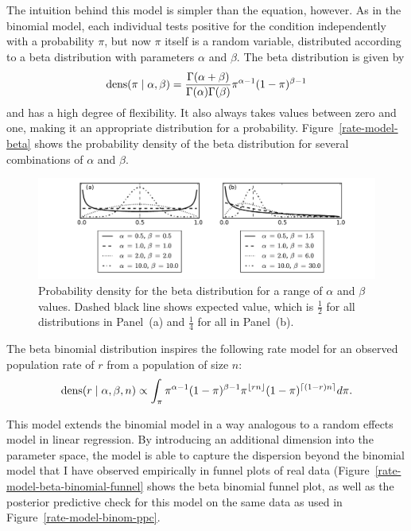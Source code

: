 The intuition behind this model is simpler than the equation,
however. As in the binomial model, each individual tests positive for
the condition independently with a probability $\pi$, but now $\pi$
itself is a random variable, distributed according to a beta
distribution with parameters $\alpha$ and $\beta$. The beta
distribution is given by 
\[
\operatorname{dens}(\pi\;|\; \alpha, \beta)
=\frac{\Gamma(\alpha+\beta)}{\Gamma(\alpha)\Gamma(\beta)}\pi^{\alpha-1}(1-\pi)^{\beta-1}
\]
and has a high degree of flexibility.  It also always takes values
between zero and one, making it an appropriate distribution for a
probability.  Figure~\ref{rate-model-beta} shows the probability
density of the beta distribution for several combinations of $\alpha$
and $\beta$.
\begin{figure}[ht]
\begin{center}
\includegraphics[width=\textwidth]{beta-distribution.pdf}
\end{center}
\caption{Probability density for the beta distribution for a range of
  $\alpha$ and $\beta$ values. Dashed black line shows expected value,
  which is $\frac{1}{2}$ for all distributions in Panel~(a) and
  $\frac{1}{4}$ for all in Panel~(b).}
\label{fig:theory-rate_model-beta}
\end{figure}

The beta binomial distribution inspires the following rate model for
an observed population rate of $r$ from a population of size $n$:
\[
\operatorname{dens}(r\;|\; \alpha, \beta, n) \propto 
\int_{\pi} \pi^{\alpha-1}(1-\pi)^{\beta-1}
\pi^{\lfloor rn\rfloor} (1-\pi)^{\lceil (1-r)n\rceil} d\pi.
\]

This model extends the binomial model in a way analogous to a random
effects model in linear regression.  By introducing an additional
dimension into the parameter space, the model is able to capture the
dispersion beyond the binomial model that I have observed empirically
in funnel plots of real data
(Figure~\ref{rate-model-beta-binomial-funnel} shows the beta
binomial funnel plot, as well as the posterior predictive check for
this model on the same data as used in
Figure~\ref{rate-model-binom-ppc}.

